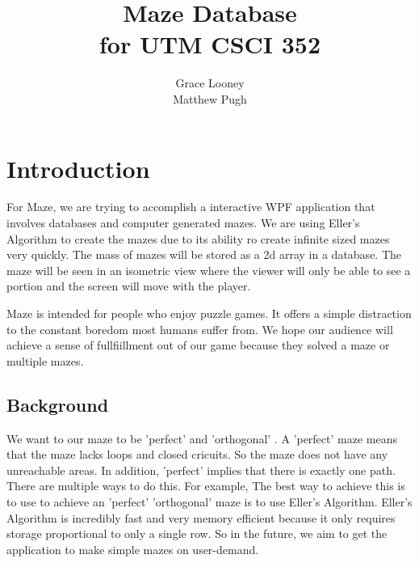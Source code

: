 \documentclass[10pt,conference,onecolumn,compsoc]{IEEEtran}
\begin{document}
\title{Maze Database\\ for UTM CSCI 352}
%
%


\author{Grace Looney\\Matthew Pugh%
}



\maketitle



\IEEEdisplaynontitleabstractindextext

\IEEEpeerreviewmaketitle



\section{Introduction}


For Maze, we are trying to accomplish a interactive WPF application that involves databases and computer generated mazes. We are using Eller's Algorithm to create the mazes due to its ability ro create infinite sized mazes very quickly. The mass of mazes will be stored as a 2d array in a database. The maze will be seen in an isometric view where the viewer will only be able to see a portion and the screen will move with the player. 

Maze is intended for people who enjoy puzzle games. It offers a simple distraction to the constant boredom most humans suffer from.  We hope our audience will achieve a sense of fullfiillment out of our game because they solved a maze or multiple mazes. 

\subsection{Background}
We want to our maze to be 'perfect' and  'orthogonal' \cite{Pullen}. A 'perfect' maze means that the maze lacks loops and closed cricuits. So the maze does not have any unreachable areas. In addition, 'perfect' implies that there is exactly one path. There are multiple ways to do this. For example, The best way to achieve this is to use to achieve an 'perfect' 'orthogonal' maze is to use Eller's Algorithm. Eller's Algorithm is incredibly fast and very memory efficient because it only requires storage proportional to only a single row. So in the future, we aim to get the application to make simple mazes on user-demand. 
\end{document}
